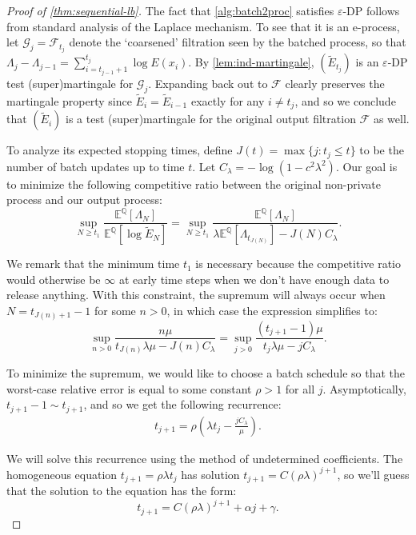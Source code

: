 \documentclass{article}
\newcommand{\E}{\mathbb{E}}
\newcommand{\Alt}{\mathbb{Q}}
\newcommand{\eps}{\varepsilon}
\begin{document}
\begin{proof}[Proof of \cref{thm:sequential-lb}]
The fact that \cref{alg:batch2proc} satisfies $\eps$-DP follows from standard analysis of the Laplace mechanism. To see that it is an e-process, let $\mathcal{G}_j = \mathcal{F}_{t_j}$ denote the `coarsened' filtration seen by the batched process, so that $\Lambda_j - \Lambda_{j-1} = \sum_{i=t_{j-1}+1}^{t_j} \log E(x_i)$. By \cref{lem:ind-martingale}, $(\widetilde E_{t_j})$ is an $\eps$-DP test (super)martingale for $\mathcal{G}_j$. Expanding back out to $\mathcal{F}$ clearly preserves the martingale property since $\widetilde E_i = \widetilde E_{i-1}$ exactly for any $i \neq t_j$, and so we conclude that $(\widetilde E_i)$ is a test (super)martingale for the original output filtration $\mathcal{F}$ as well.

To analyze its expected stopping times, define $J(t) = \max \lbrace j : t_j \leq t \rbrace$ to be the number of batch updates up to time $t$. Let $C_\lambda = -\log(1-c^2\lambda^2)$. Our goal is to minimize the following competitive ratio between the original non-private process and our output process:
\begin{equation*}
    \sup_{N \geq t_1} \frac{\E^\Alt[\Lambda_N]}{\E^\Alt[\log \widetilde E_N]} =\sup_{N \geq t_1} \frac{\E^\Alt[\Lambda_N]}{\lambda \E^\Alt[\Lambda_{t_{J(N)}}] - J(N) C_\lambda}.
\end{equation*}

We remark that the minimum time $t_1$ is necessary because the competitive ratio would otherwise be $\infty$ at early time steps when we don't have enough data to release anything. With this constraint, the supremum will always occur when $N=t_{J(n)+1}-1$ for some $n>0$, in which case the expression simplifies to:
\begin{equation*}
    \sup_{n>0} \frac{n \mu}{t_{J(n)} \lambda\mu  - J(n)C_\lambda} = \sup_{j>0} \frac{(t_{j+1}-1)\mu}{t_j\lambda\mu - jC_\lambda}.
\end{equation*}

To minimize the supremum, we would like to choose a batch schedule so that the worst-case relative error is equal to some constant $\rho>1$ for all $j$. Asymptotically, $t_{j+1} -1 \sim t_{j+1}$, and so we get the following recurrence:
\begin{align*}
    t_{j+1} = \rho \left(\lambda  t_j - \frac{ jC_\lambda}{\mu} \right).
\end{align*}

We will solve this recurrence using the method of undetermined coefficients. The homogeneous equation $t_{j+1} = \rho\lambda t_j$ has solution $t_{j+1} = C(\rho\lambda)^{j+1}$, so we'll guess that the solution to the equation has the form:
\begin{equation*}
    t_{j+1} = C(\rho\lambda)^{j+1} + \alpha j + \gamma.
\end{equation*}


\end{proof}
\end{document}
